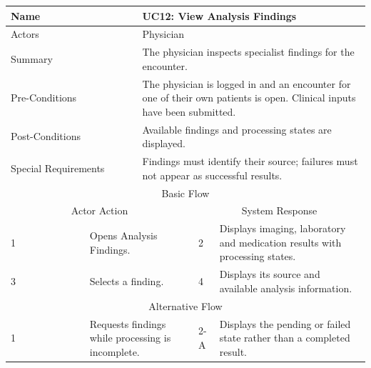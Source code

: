 \begin{reporttable}
\centering
\small
\caption{UC12: View Analysis Findings.}
\label{tab:kashaf:uc12}
\begin{tabular}{|p{}|p{}|p{}|p{}|p{}|}
\hline
\multicolumn{2}{|p{\dimexpr0.225\textwidth+2\tabcolsep+\arrayrulewidth\relax}|}{Name} & \multicolumn{3}{p{\dimexpr0.575\textwidth+4\tabcolsep+2\arrayrulewidth\relax}|}{UC12: View Analysis Findings} \\ \hline
\multicolumn{2}{|p{\dimexpr0.225\textwidth+2\tabcolsep+\arrayrulewidth\relax}|}{Actors} & \multicolumn{3}{p{\dimexpr0.575\textwidth+4\tabcolsep+2\arrayrulewidth\relax}|}{Physician} \\ \hline
\multicolumn{2}{|p{\dimexpr0.225\textwidth+2\tabcolsep+\arrayrulewidth\relax}|}{Summary} & \multicolumn{3}{p{\dimexpr0.575\textwidth+4\tabcolsep+2\arrayrulewidth\relax}|}{The physician inspects specialist findings for the encounter.} \\ \hline
\multicolumn{2}{|p{\dimexpr0.225\textwidth+2\tabcolsep+\arrayrulewidth\relax}|}{Pre-Conditions} & \multicolumn{3}{p{\dimexpr0.575\textwidth+4\tabcolsep+2\arrayrulewidth\relax}|}{The physician is logged in and an encounter for one of their own patients is open. Clinical inputs have been submitted.} \\ \hline
\multicolumn{2}{|p{\dimexpr0.225\textwidth+2\tabcolsep+\arrayrulewidth\relax}|}{Post-Conditions} & \multicolumn{3}{p{\dimexpr0.575\textwidth+4\tabcolsep+2\arrayrulewidth\relax}|}{Available findings and processing states are displayed.} \\ \hline
\multicolumn{2}{|p{\dimexpr0.225\textwidth+2\tabcolsep+\arrayrulewidth\relax}|}{Special Requirements} & \multicolumn{3}{p{\dimexpr0.575\textwidth+4\tabcolsep+2\arrayrulewidth\relax}|}{Findings must identify their source; failures must not appear as successful results.} \\ \hline
\multicolumn{5}{|c|}{Basic Flow} \\ \hline
\multicolumn{3}{|c|}{Actor Action} & \multicolumn{2}{c|}{System Response} \\ \hline
1 & \multicolumn{2}{p{\dimexpr0.37\textwidth+2\tabcolsep+\arrayrulewidth\relax}|}{Opens Analysis Findings.} & 2 & Displays imaging, laboratory and medication results with processing states. \\ \hline
3 & \multicolumn{2}{p{\dimexpr0.37\textwidth+2\tabcolsep+\arrayrulewidth\relax}|}{Selects a finding.} & 4 & Displays its source and available analysis information. \\ \hline
\multicolumn{5}{|c|}{Alternative Flow} \\ \hline
1 & \multicolumn{2}{p{\dimexpr0.37\textwidth+2\tabcolsep+\arrayrulewidth\relax}|}{Requests findings while processing is incomplete.} & 2-A & Displays the pending or failed state rather than a completed result. \\ \hline
\end{tabular}
\end{reporttable}

